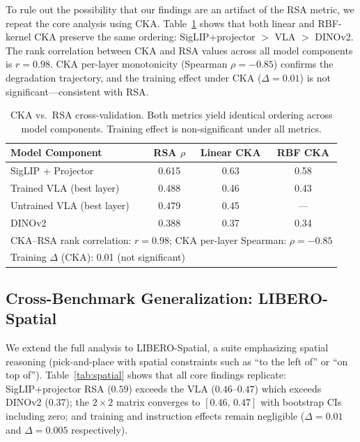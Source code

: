 \documentclass[10pt,letterpaper]{article}
\begin{document}
To rule out the possibility that our findings are an artifact of the RSA metric, we repeat the core analysis using CKA.
Table~\ref{tab:cka} shows that both linear and RBF-kernel CKA preserve the same ordering: SigLIP+projector $>$ VLA $>$ DINOv2.
The rank correlation between CKA and RSA values across all model components is $r{=}0.98$.
CKA per-layer monotonicity (Spearman $\rho{=}{-}0.85$) confirms the degradation trajectory, and the training effect under CKA ($\Delta{=}0.01$) is not significant---consistent with RSA.

\begin{table}[t]
\centering
\caption{CKA vs.\ RSA cross-validation. Both metrics yield identical ordering across model components. Training effect is non-significant under all metrics.}
\label{tab:cka}
\begin{tabular}{lccc}
\toprule
\textbf{Model Component} & \textbf{RSA $\rho$} & \textbf{Linear CKA} & \textbf{RBF CKA} \\
\midrule
SigLIP + Projector       & 0.615 & 0.63 & 0.58 \\
Trained VLA (best layer)  & 0.488 & 0.46 & 0.43 \\
Untrained VLA (best layer) & 0.479 & 0.45 & --- \\
DINOv2                    & 0.388 & 0.37 & 0.34 \\
\midrule
\multicolumn{4}{l}{\small CKA--RSA rank correlation: $r = 0.98$; CKA per-layer Spearman: $\rho = -0.85$} \\
\multicolumn{4}{l}{\small Training $\Delta$ (CKA): 0.01 (not significant)} \\
\bottomrule
\end{tabular}
\end{table}


\subsection{Cross-Benchmark Generalization: LIBERO-Spatial}
\label{sec:exp_spatial}

We extend the full analysis to LIBERO-Spatial, a suite emphasizing spatial reasoning (pick-and-place with spatial constraints such as ``to the left of'' or ``on top of'').
Table~\ref{tab:spatial} shows that all core findings replicate:
SigLIP+projector RSA ($0.59$) exceeds the VLA ($0.46$--$0.47$) which exceeds DINOv2 ($0.37$);
the $2{\times}2$ matrix converges to $[0.46,\, 0.47]$ with bootstrap CIs including zero;
and training and instruction effects remain negligible ($\Delta{=}0.01$ and $\Delta{=}0.005$ respectively).
\end{document}
